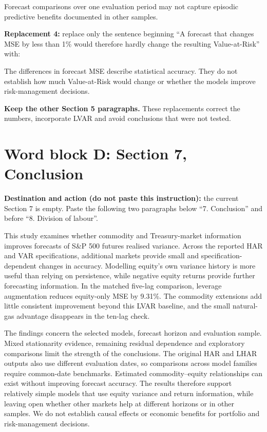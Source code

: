 \documentclass[11pt,a4paper]{article}
\begin{document}
Forecast comparisons over one evaluation period may not capture episodic predictive benefits documented in other samples.

\textbf{Replacement 4:} replace only the sentence beginning ``A forecast that changes MSE by less than 1\% would therefore hardly change the resulting Value-at-Risk'' with:

The differences in forecast MSE describe statistical accuracy. They do not establish how much Value-at-Risk would change or whether the models improve risk-management decisions.

\medskip
\textbf{Keep the other Section 5 paragraphs.} These replacements correct the numbers, incorporate LVAR and avoid conclusions that were not tested.

\clearpage
\section*{Word block D: Section 7, Conclusion}

\textbf{Destination and action (do not paste this instruction):} the current Section 7 is empty. Paste the following two paragraphs below ``7. Conclusion'' and before ``8. Division of labour''.

This study examines whether commodity and Treasury-market information improves forecasts of S\&P 500 futures realised variance. Across the reported HAR and VAR specifications, additional markets provide small and specification-dependent changes in accuracy. Modelling equity's own variance history is more useful than relying on persistence, while negative equity returns provide further forecasting information. In the matched five-lag comparison, leverage augmentation reduces equity-only MSE by 9.31\%. The commodity extensions add little consistent improvement beyond this LVAR baseline, and the small natural-gas advantage disappears in the ten-lag check.

The findings concern the selected models, forecast horizon and evaluation sample. Mixed stationarity evidence, remaining residual dependence and exploratory comparisons limit the strength of the conclusions. The original HAR and LHAR outputs also use different evaluation dates, so comparisons across model families require common-date benchmarks. Estimated commodity--equity relationships can exist without improving forecast accuracy. The results therefore support relatively simple models that use equity variance and return information, while leaving open whether other markets help at different horizons or in other samples. We do not establish causal effects or economic benefits for portfolio and risk-management decisions.
\end{document}
